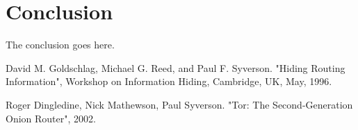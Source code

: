 \documentclass[journal]{IEEEtran}
\begin{document}
		
	\section{Conclusion}
		The conclusion goes here.
		
		
	\appendices
			
			
			
			
			
			
		
		
	\begin{thebibliography}{1}

			David M. Goldschlag, Michael G. Reed, and Paul F. Syverson. "Hiding Routing Information", Workshop on Information Hiding, Cambridge, UK, May, 1996.
		
			Roger Dingledine, Nick Mathewson, Paul Syverson. "Tor: The Second-Generation Onion Router", 2002.
		
	\end{thebibliography}
\end{document}
